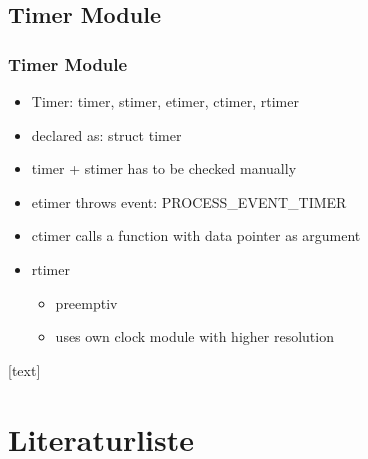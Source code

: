 \documentclass{beamer}
\begin{document}
\subsection*{Timer Module}
\begin{frame}[fragile]
\frametitle{Timer Module}
\begin{itemize}
\item Timer: timer, stimer, etimer, ctimer, rtimer
\item declared as: struct timer
\item timer + stimer has to be checked manually
\item etimer throws event: PROCESS\_EVENT\_TIMER
\item ctimer calls a function with data pointer as argument
\item rtimer
\begin{itemize}
\item preemptiv
\item uses own clock module with higher resolution
\end{itemize}
\end{itemize}

\end{frame}


[text]
\section{Literaturliste}
\begin{frame}
\nocite{Eckert13}
\nocite{Engelbrecht04}
{}

\end{frame}
\end{document}
